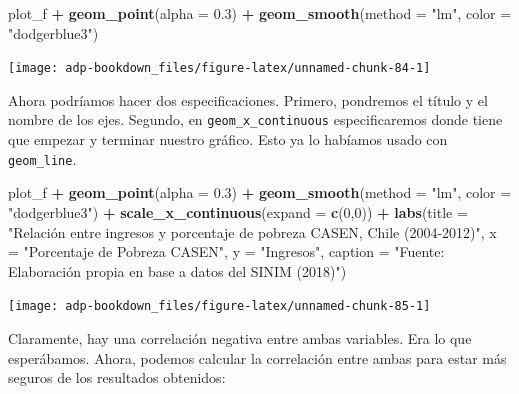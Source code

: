 \documentclass[]{book}
\newenvironment{Shaded}{\begin{snugshade}}{\end{snugshade}}
\newcommand{\DataTypeTok}[1]{\textcolor[rgb]{0.13,0.29,0.53}{#1}}
\newcommand{\DecValTok}[1]{\textcolor[rgb]{0.00,0.00,0.81}{#1}}
\newcommand{\FloatTok}[1]{\textcolor[rgb]{0.00,0.00,0.81}{#1}}
\newcommand{\KeywordTok}[1]{\textcolor[rgb]{0.13,0.29,0.53}{\textbf{#1}}}
\newcommand{\NormalTok}[1]{#1}
\newcommand{\OperatorTok}[1]{\textcolor[rgb]{0.81,0.36,0.00}{\textbf{#1}}}
\newcommand{\StringTok}[1]{\textcolor[rgb]{0.31,0.60,0.02}{#1}}
\begin{document}
\begin{Shaded}
\begin{Highlighting}[]
\NormalTok{plot_f }\OperatorTok{+}\StringTok{ }
\StringTok{  }\KeywordTok{geom_point}\NormalTok{(}\DataTypeTok{alpha =} \FloatTok{0.3}\NormalTok{) }\OperatorTok{+}
\StringTok{  }\KeywordTok{geom_smooth}\NormalTok{(}\DataTypeTok{method =} \StringTok{"lm"}\NormalTok{, }\DataTypeTok{color =} \StringTok{"dodgerblue3"}\NormalTok{) }
\end{Highlighting}
\end{Shaded}

\begin{center}\texttt{[image: adp-bookdown\_files/figure-latex/unnamed-chunk-84-1]} \end{center}

Ahora podríamos hacer dos especificaciones. Primero, pondremos el título
y el nombre de los ejes. Segundo, en \texttt{geom\_x\_continuous}
especificaremos donde tiene que empezar y terminar nuestro gráfico. Esto
ya lo habíamos usado con \texttt{geom\_line}.

\begin{Shaded}
\begin{Highlighting}[]
\NormalTok{plot_f }\OperatorTok{+}\StringTok{ }
\StringTok{  }\KeywordTok{geom_point}\NormalTok{(}\DataTypeTok{alpha =} \FloatTok{0.3}\NormalTok{) }\OperatorTok{+}
\StringTok{  }\KeywordTok{geom_smooth}\NormalTok{(}\DataTypeTok{method =} \StringTok{"lm"}\NormalTok{, }\DataTypeTok{color =} \StringTok{"dodgerblue3"}\NormalTok{) }\OperatorTok{+}
\StringTok{  }\KeywordTok{scale_x_continuous}\NormalTok{(}\DataTypeTok{expand =} \KeywordTok{c}\NormalTok{(}\DecValTok{0}\NormalTok{,}\DecValTok{0}\NormalTok{)) }\OperatorTok{+}
\StringTok{  }\KeywordTok{labs}\NormalTok{(}\DataTypeTok{title =} \StringTok{"Relación entre ingresos y porcentaje de pobreza CASEN, Chile (2004-2012)"}\NormalTok{, }
       \DataTypeTok{x =} \StringTok{"Porcentaje de Pobreza CASEN"}\NormalTok{, }\DataTypeTok{y =} \StringTok{"Ingresos"}\NormalTok{, }
       \DataTypeTok{caption =} \StringTok{"Fuente: Elaboración propia en base a datos del SINIM (2018)"}\NormalTok{) }
\end{Highlighting}
\end{Shaded}

\begin{center}\texttt{[image: adp-bookdown\_files/figure-latex/unnamed-chunk-85-1]} \end{center}

Claramente, hay una correlación negativa entre ambas variables. Era lo
que esperábamos. Ahora, podemos calcular la correlación entre ambas para
estar más seguros de los resultados obtenidos:
\end{document}
